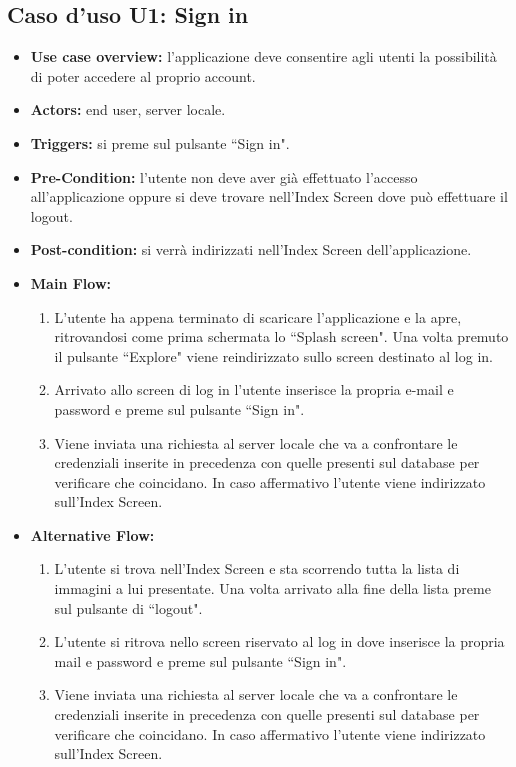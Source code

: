 \subsection*{Caso d'uso U1: Sign in}
\begin{itemize}
    \item  \textbf{Use case overview:} l'applicazione deve consentire agli utenti la possibilit\`a di poter accedere al proprio account.
    \item \textbf{Actors:} end user, server locale.
    \item \textbf{Triggers:} si preme sul pulsante ``Sign in".
    \item \textbf{Pre-Condition:} l'utente non deve aver gi\`a effettuato l'accesso all'applicazione oppure si deve trovare nell'Index Screen dove pu\`o effettuare il logout.
    \item \textbf{Post-condition:} si verr\`a indirizzati nell'Index Screen dell'applicazione.
    \item \textbf{Main Flow:} \begin{enumerate}
              \item L'utente ha appena terminato di scaricare l'applicazione e la apre, ritrovandosi come prima schermata lo ``Splash screen". Una volta premuto il pulsante ``Explore" viene reindirizzato sullo screen destinato al log in.
              \item Arrivato allo screen di log in l'utente inserisce la propria e-mail e password e preme sul pulsante ``Sign in".
              \item Viene inviata una richiesta al server locale che va a confrontare le credenziali inserite in precedenza con quelle presenti sul database per verificare che coincidano. In caso affermativo l'utente viene indirizzato sull'Index Screen.

          \end{enumerate}
    \item \textbf{Alternative Flow:}\begin{enumerate}
              \item L'utente si trova nell'Index Screen e sta scorrendo tutta la lista di immagini a lui presentate. Una volta arrivato alla fine della lista preme sul pulsante di ``logout".
              \item L'utente si ritrova nello screen riservato al log in dove inserisce la propria mail e password e preme sul pulsante ``Sign in".
              \item Viene inviata una richiesta al server locale che va a confrontare le credenziali inserite in precedenza con quelle presenti sul database per verificare che coincidano. In caso affermativo l'utente viene indirizzato sull'Index Screen.
          \end{enumerate}


\end{itemize}
